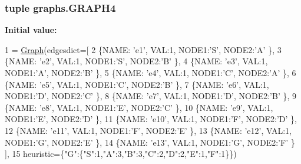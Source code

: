 \subsubsection[{G\+R\+A\+P\+H4}]{\setlength{\rightskip}{0pt plus 5cm}tuple graphs.\+G\+R\+A\+P\+H4}\label{namespacegraphs_a71e8d3e8053782d78d30e3661cb731d6}
{\bfseries Initial value\+:}
\begin{DoxyCode}
1 = \hyperlink{classsearch_1_1_graph}{Graph}(edgesdict=[
2         \{NAME: \textcolor{stringliteral}{'e1'},  VAL:1, NODE1:\textcolor{stringliteral}{'S'}, NODE2:\textcolor{stringliteral}{'A'} \},
3         \{NAME: \textcolor{stringliteral}{'e2'},  VAL:1, NODE1:\textcolor{stringliteral}{'S'}, NODE2:\textcolor{stringliteral}{'B'} \},
4         \{NAME: \textcolor{stringliteral}{'e3'},  VAL:1, NODE1:\textcolor{stringliteral}{'A'}, NODE2:\textcolor{stringliteral}{'B'} \},
5         \{NAME: \textcolor{stringliteral}{'e4'},  VAL:1, NODE1:\textcolor{stringliteral}{'C'}, NODE2:\textcolor{stringliteral}{'A'} \},
6         \{NAME: \textcolor{stringliteral}{'e5'},  VAL:1, NODE1:\textcolor{stringliteral}{'C'}, NODE2:\textcolor{stringliteral}{'B'} \},
7         \{NAME: \textcolor{stringliteral}{'e6'},  VAL:1, NODE1:\textcolor{stringliteral}{'D'}, NODE2:\textcolor{stringliteral}{'C'} \},
8         \{NAME: \textcolor{stringliteral}{'e7'},  VAL:1, NODE1:\textcolor{stringliteral}{'D'}, NODE2:\textcolor{stringliteral}{'B'} \},
9         \{NAME: \textcolor{stringliteral}{'e8'},  VAL:1, NODE1:\textcolor{stringliteral}{'E'}, NODE2:\textcolor{stringliteral}{'C'} \},
10         \{NAME: \textcolor{stringliteral}{'e9'},  VAL:1, NODE1:\textcolor{stringliteral}{'E'}, NODE2:\textcolor{stringliteral}{'D'} \},
11         \{NAME: \textcolor{stringliteral}{'e10'}, VAL:1, NODE1:\textcolor{stringliteral}{'F'}, NODE2:\textcolor{stringliteral}{'D'} \},
12         \{NAME: \textcolor{stringliteral}{'e11'}, VAL:1, NODE1:\textcolor{stringliteral}{'F'}, NODE2:\textcolor{stringliteral}{'E'} \},
13         \{NAME: \textcolor{stringliteral}{'e12'}, VAL:1, NODE1:\textcolor{stringliteral}{'G'}, NODE2:\textcolor{stringliteral}{'E'} \},
14         \{NAME: \textcolor{stringliteral}{'e13'}, VAL:1, NODE1:\textcolor{stringliteral}{'G'}, NODE2:\textcolor{stringliteral}{'F'} \} ],
15                heuristic=\{\textcolor{stringliteral}{"G"}:\{\textcolor{stringliteral}{"S"}:1,\textcolor{stringliteral}{"A"}:3,\textcolor{stringliteral}{"B"}:3,\textcolor{stringliteral}{"C"}:2,\textcolor{stringliteral}{"D"}:2,\textcolor{stringliteral}{"E"}:1,\textcolor{stringliteral}{"F"}:1\}\})
\end{DoxyCode}
\hypertarget{namespacegraphs_af8cb560a89de7afc3b01d32223a5b80f}{}
